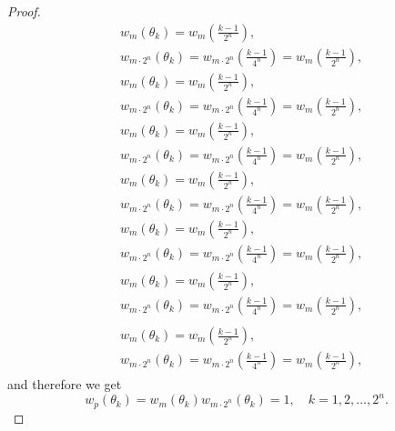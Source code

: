 \documentclass{amsart}
\numberwithin{equation}{section}
\begin{document}
\begin{proof}
{\begin{align}
&w_m(\theta_k)=w_m\left(\frac{k-1}{2^n}\right),\\
&w_{m\cdot 2^n}(\theta_k)=w_{m\cdot 2^n}\left(\frac{k-1}{4^n}\right)=w_m\left(\frac{k-1}{2^n}\right),
\end{align}\fi    
{}\begin{gather*}
&w_m(\theta_k)=w_m\left(\frac{k-1}{2^n}\right),\\
&w_{m\cdot 2^n}(\theta_k)=w_{m\cdot 2^n}\left(\frac{k-1}{4^n}\right)=w_m\left(\frac{k-1}{2^n}\right),
\end{gather*}\fi  
{}\begin{gather}
&w_m(\theta_k)=w_m\left(\frac{k-1}{2^n}\right),\\
&w_{m\cdot 2^n}(\theta_k)=w_{m\cdot 2^n}\left(\frac{k-1}{4^n}\right)=w_m\left(\frac{k-1}{2^n}\right),
\end{gather}\fi   
{}\begin{multline*}
&w_m(\theta_k)=w_m\left(\frac{k-1}{2^n}\right),\\
&w_{m\cdot 2^n}(\theta_k)=w_{m\cdot 2^n}\left(\frac{k-1}{4^n}\right)=w_m\left(\frac{k-1}{2^n}\right),
\end{multline*}\fi  
{}\begin{multline}
&w_m(\theta_k)=w_m\left(\frac{k-1}{2^n}\right),\\
&w_{m\cdot 2^n}(\theta_k)=w_{m\cdot 2^n}\left(\frac{k-1}{4^n}\right)=w_m\left(\frac{k-1}{2^n}\right),
\end{multline}\fi  
{}\begin{multline*}\begin{split}
&w_m(\theta_k)=w_m\left(\frac{k-1}{2^n}\right),\\
&w_{m\cdot 2^n}(\theta_k)=w_{m\cdot 2^n}\left(\frac{k-1}{4^n}\right)=w_m\left(\frac{k-1}{2^n}\right),
\end{split}\end{multline*}\fi
{}\begin{multline}\begin{split}
&w_m(\theta_k)=w_m\left(\frac{k-1}{2^n}\right),\\
&w_{m\cdot 2^n}(\theta_k)=w_{m\cdot 2^n}\left(\frac{k-1}{4^n}\right)=w_m\left(\frac{k-1}{2^n}\right),
\end{split}\end{multline}\fi
}
and therefore we get
{
\begin{equation*} \label{a13}
w_p(\theta_k)=w_m(\theta_k)w_{m\cdot 2^n}(\theta_k)=1,\quad k=1,2,\ldots, 2^n.
 \end{equation*}\fi  
}
\end{proof}
\end{document}
